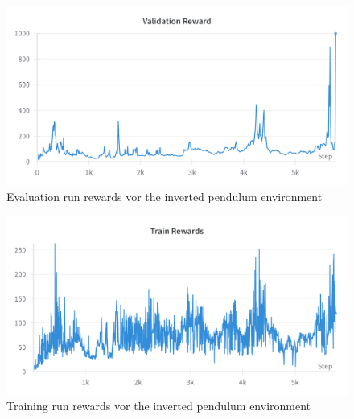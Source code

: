 \documentclass[11pt, a4paper]{article}
\begin{document}
\begin{figure}
    \centering
    \includegraphics[width=13cm]{pendulum_eval.png}
    \caption{Evaluation run rewards vor the inverted pendulum environment}
    \label{REIN:Pen_eval}
\end{figure}

\begin{figure}
    \centering
    \includegraphics[width=13cm]{pendulum_train.png}
    \caption{Training run rewards vor the inverted pendulum environment}
    \label{REIN:Pen_tra}
\end{figure}
\end{document}
